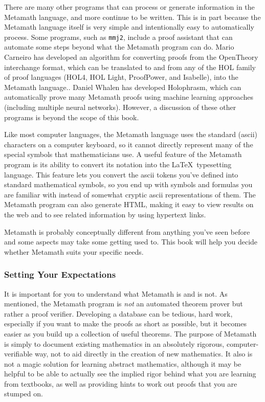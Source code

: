 There are many other programs that can process or generate information
in the Metamath language, and more continue to be written.
This is in part because the Metamath language itself is very simple
and intentionally easy to automatically process.
Some programs, such as \texttt{mmj2}, include a proof assistant
that can automate some steps beyond what the Metamath program can do.
Mario Carneiro has developed an algorithm for converting proofs from
the OpenTheory interchange format, which can be translated to and from
any of the HOL family of proof languages (HOL4, HOL Light, ProofPower,
and Isabelle), into the
Metamath language.\cite{DBLP:journals/corr/Carneiro14}.
Daniel Whalen has developed Holophrasm, which can automatically
prove many Metamath proofs using
machine learning
approaches
(including multiple neural networks)\cite{DBLP:journals/corr/Whalen16}.
However,
a discussion of these other programs is beyond the scope of this book.

Like most computer languages, the Metamath language uses the
standard ({\sc ascii}) characters on a computer keyboard, so it cannot
directly represent many of the special symbols that mathematicians use.  A
useful feature of the Metamath program is its ability to convert its notation
into the \LaTeX\ typesetting language.  This feature
lets you convert the {\sc ascii} tokens you've defined into standard
mathematical symbols, so you end up with symbols and formulas you are familiar
with instead of somewhat cryptic {\sc ascii} representations of them.
The Metamath program can also generate HTML, making it easy
to view results on the web and to see related information by using
hypertext links.

Metamath is probably conceptually different from anything you've seen
before and some aspects may take some getting used to.  This book will
help you decide whether Metamath suits your specific needs.

\subsubsection{Setting Your Expectations}
It is important for you to understand what Metamath is and is
not.  As mentioned, the Metamath program
is {\em not} an automated theorem prover but
rather a proof verifier.  Developing a database can be tedious, hard work,
especially if you want to make the proofs as short as possible, but it becomes
easier as you build up a collection of useful theorems.  The purpose of
Metamath is simply to document existing mathematics in an absolutely rigorous,
computer-verifiable way, not to aid directly in the creation of new
mathematics.  It also is not a magic solution for learning abstract
mathematics, although it may be helpful to be able to actually see the implied
rigor behind what you are learning from textbooks, as well as providing hints
to work out proofs that you are stumped on.

